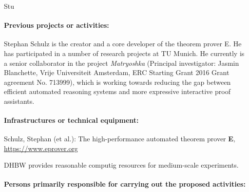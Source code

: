 \begin{sitedescription}{Stu}
\paragraph*{Previous projects or activities:}

\begin{compactitem}
\item Stephan Schulz is the creator and a core developer of the
  theorem prover E.  He has participated in a number of research
  projects at TU Munich. He currently is a senior collaborator in the
  project \emph{Matryoshka} (Principal investigator: Jasmin
  Blanchette, Vrije Universiteit Amsterdam, ERC Starting Grant 2016
  Grant agreement No. 713999), which is working towards reducing the
  gap between efficient automated reasoning systems and more
  expressive interactive proof assistants.
\end{compactitem}

\paragraph*{Infrastructures or technical equipment:}

\begin{compactitem}
\item Schulz, Stephan (et al.): The high-performance automated theorem
  prover \textbf{E}, \url{https://www.eprover.org}
\item DHBW provides reasonable computig resources for medium-scale
  experiments.
\end{compactitem}




\paragraph*{Persons primarily responsible for carrying out the proposed activities:}


\end{sitedescription}
